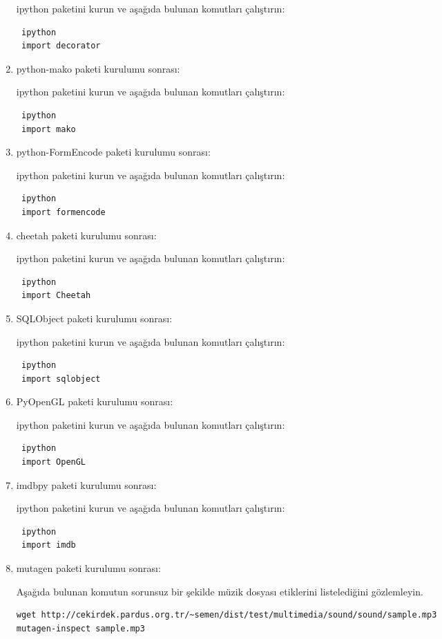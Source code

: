 \documentclass[a4paper,10pt]{article}
\begin{document}
\begin{enumerate}
ipython paketini kurun ve aşağıda bulunan komutları çalıştırın:
\begin{verbatim}
 ipython
 import decorator
\end{verbatim}
\item python-mako paketi kurulumu sonrası:

ipython paketini kurun ve aşağıda bulunan komutları çalıştırın:
\begin{verbatim}
 ipython
 import mako
\end{verbatim}

\item python-FormEncode paketi kurulumu sonrası:

ipython paketini kurun ve aşağıda bulunan komutları çalıştırın:
\begin{verbatim}
 ipython
 import formencode
\end{verbatim}

\item cheetah  paketi kurulumu sonrası:

ipython paketini kurun ve aşağıda bulunan komutları çalıştırın:
\begin{verbatim}
 ipython
 import Cheetah
\end{verbatim}


\item SQLObject  paketi kurulumu sonrası:

ipython paketini kurun ve aşağıda bulunan komutları çalıştırın:
\begin{verbatim}
 ipython
 import sqlobject
\end{verbatim}

\item PyOpenGL  paketi kurulumu sonrası:

ipython paketini kurun ve aşağıda bulunan komutları çalıştırın:
\begin{verbatim}
 ipython
 import OpenGL
\end{verbatim}

\item imdbpy  paketi kurulumu sonrası:

ipython paketini kurun ve aşağıda bulunan komutları çalıştırın:
\begin{verbatim}
 ipython
 import imdb
\end{verbatim}

\item mutagen  paketi kurulumu sonrası:

Aşağıda bulunan komutun sorunsuz bir şekilde müzik dosyası etiklerini listelediğini gözlemleyin.
\begin{verbatim}
wget http://cekirdek.pardus.org.tr/~semen/dist/test/multimedia/sound/sound/sample.mp3 
mutagen-inspect sample.mp3
\end{verbatim}



\end{enumerate}
\end{document}
